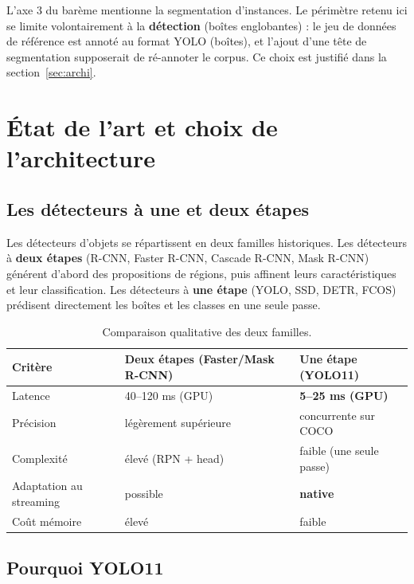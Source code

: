 \documentclass[11pt,a4paper]{article}
\begin{document}
L'axe 3 du barème mentionne la segmentation d'instances. Le périmètre
retenu ici se limite volontairement à la \textbf{détection} (boîtes
englobantes) : le jeu de données de référence est annoté au format YOLO
(boîtes), et l'ajout d'une tête de segmentation supposerait de ré-annoter
le corpus. Ce choix est justifié dans la section~\ref{sec:archi}.

\section{État de l'art et choix de l'architecture}

\subsection{Les détecteurs à une et deux étapes}

Les détecteurs d'objets se répartissent en deux familles historiques.
Les détecteurs à \textbf{deux étapes} (R-CNN, Faster R-CNN, Cascade
R-CNN, Mask R-CNN) générent d'abord des propositions de régions, puis
affinent leurs caractéristiques et leur classification. Les détecteurs à
\textbf{une étape} (YOLO, SSD, DETR, FCOS) prédisent directement les
boîtes et les classes en une seule passe.

\begin{table}[H]
\centering
\caption{Comparaison qualitative des deux familles.}
\begin{tabular}{@{}p{3.2cm}p{5.2cm}p{5.0cm}@{}}
\toprule
\textbf{Critère} & \textbf{Deux étapes (Faster/Mask R-CNN)} & \textbf{Une étape (YOLO11)} \\
\midrule
Latence      & 40--120 ms (GPU)            & \textbf{5--25 ms (GPU)} \\
Précision    & légèrement supérieure         & concurrente sur COCO \\
Complexité   & élevé (RPN + head)           & faible (une seule passe) \\
Adaptation au streaming & possible            & \textbf{native} \\
Coût mémoire  & élevé                        & faible \\
\bottomrule
\end{tabular}
\end{table}

\subsection{Pourquoi YOLO11}
\end{document}
